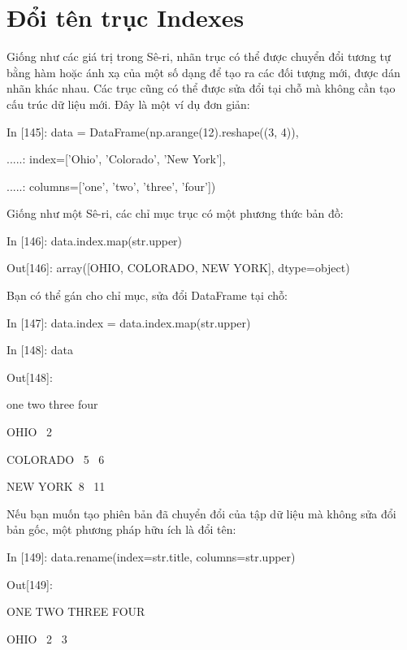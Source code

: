 \section{Đổi tên trục Indexes}
Giống như các giá trị trong Sê-ri, nhãn trục có thể được chuyển đổi tương tự bằng hàm hoặc ánh xạ 
của một số dạng để tạo ra các đối tượng mới, được dán nhãn khác nhau. Các trục cũng có thể được sửa đổi 
tại chỗ mà không cần tạo cấu trúc dữ liệu mới. Đây là một ví dụ đơn giản:\par
    \quad\textup{In [145]: data = DataFrame(np.arange(12).reshape((3, 4)), }\par
    \quad\textup{ .....: \quad\quad\quad\quad\quad                 index=['Ohio', 'Colorado', 'New York'], }\par
    \quad\textup{ .....: \quad\quad\quad\quad\quad                 columns=['one', 'two', 'three', 'four']) }\par
Giống như một Sê-ri, các chỉ mục trục có một phương thức bản đồ: \par
    \quad\textup{In [146]: data.index.map(str.upper)  }\par
    \quad\textup{Out[146]: array([OHIO, COLORADO, NEW YORK], dtype=object)  }\par
Bạn có thể gán cho chỉ mục, sửa đổi DataFrame tại chỗ:\par
    \quad\textup{In [147]: data.index = data.index.map(str.upper) }\par
    \quad\textup{In [148]: data}\par
    \quad\textup{Out[148]: }\par
    \quad\quad\quad\textup{\quad\quad\quad\quad one  two  three  four }\par
    \quad\textup{OHIO \quad\quad\quad{} \quad\       2   }\par
    \quad\textup{COLORADO \quad\    5 \quad\      6    }\par
    \quad\textup{NEW YORK\quad\  8   \    11  }\par
Nếu bạn muốn tạo phiên bản đã chuyển đổi của tập dữ liệu mà không sửa đổi bản gốc, một phương pháp hữu ích là đổi tên:\par
    \quad\textup{In [149]: data.rename(index=str.title, columns=str.upper) }\par
    \quad\textup{Out[149]: }\par
    \quad\quad\quad\textup{\quad\quad\quad\quad ONE  TWO  THREE  FOUR  }\par
    \quad\textup{OHIO \quad\quad\quad{} \quad{}\quad\quad\         2 \quad\quad\     3  }\par
